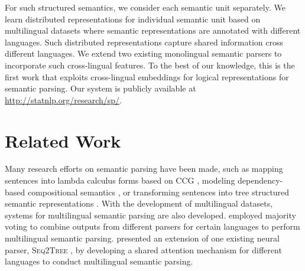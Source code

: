 \documentclass[11pt,a4paper]{article}
\begin{document}
For such structured semantics, we consider each semantic unit separately.
We learn distributed representations for individual semantic unit based on multilingual datasets where semantic representations are annotated with different languages.
Such distributed representations capture shared information cross different languages.
We extend two existing monolingual semantic parsers \cite{Luw:15,Rhs:17} to incorporate such cross-lingual features.
To the best of our knowledge, this is the first work that exploits cross-lingual embeddings for logical representations for semantic parsing.
Our system is publicly available at {\url{http://statnlp.org/research/sp/}}.

\section{Related Work}
Many research efforts on semantic parsing have been made, such as mapping sentences into lambda calculus forms based on CCG \cite{yoav11boot,yoav14compact,kwiatkowski2011lexical:11}, modeling dependency-based compositional semantics \cite{liang11dcs,liang17dcs}, or transforming sentences into tree structured semantic representations \cite{Luw:15,Rhs:17}.
With the development of multilingual datasets, systems for multilingual semantic parsing are also developed.
 employed majority voting to combine outputs from different parsers for certain languages to perform multilingual semantic parsing.
 presented an extension of one existing neural parser, {\textsc{Seq2Tree}} \cite{P16-1004}, by developing a shared attention mechanism for different languages to conduct multilingual semantic parsing.
\end{document}
